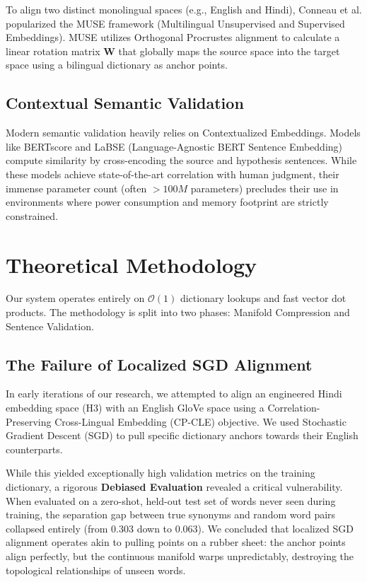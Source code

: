 \documentclass[conference]{IEEEtran}
\begin{document}
To align two distinct monolingual spaces (e.g., English and Hindi), Conneau et al. \cite{b5} popularized the MUSE framework (Multilingual Unsupervised and Supervised Embeddings). MUSE utilizes Orthogonal Procrustes alignment to calculate a linear rotation matrix $\mathbf{W}$ that globally maps the source space into the target space using a bilingual dictionary as anchor points. 

\subsection{Contextual Semantic Validation}
Modern semantic validation heavily relies on Contextualized Embeddings. Models like BERTscore \cite{b6} and LaBSE (Language-Agnostic BERT Sentence Embedding) \cite{b7} compute similarity by cross-encoding the source and hypothesis sentences. While these models achieve state-of-the-art correlation with human judgment, their immense parameter count (often $>100M$ parameters) precludes their use in environments where power consumption and memory footprint are strictly constrained.

\section{Theoretical Methodology}
Our system operates entirely on $\mathcal{O}(1)$ dictionary lookups and fast vector dot products. The methodology is split into two phases: Manifold Compression and Sentence Validation.

\subsection{The Failure of Localized SGD Alignment}
In early iterations of our research, we attempted to align an engineered Hindi embedding space (H3) with an English GloVe space using a Correlation-Preserving Cross-Lingual Embedding (CP-CLE) objective. We used Stochastic Gradient Descent (SGD) to pull specific dictionary anchors towards their English counterparts.

While this yielded exceptionally high validation metrics on the training dictionary, a rigorous \textbf{Debiased Evaluation} revealed a critical vulnerability. When evaluated on a zero-shot, held-out test set of words never seen during training, the separation gap between true synonyms and random word pairs collapsed entirely (from 0.303 down to 0.063). We concluded that localized SGD alignment operates akin to pulling points on a rubber sheet: the anchor points align perfectly, but the continuous manifold warps unpredictably, destroying the topological relationships of unseen words.
\end{document}
